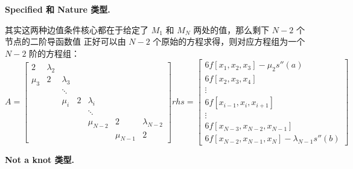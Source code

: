 \documentclass[a4paper]{article}
\begin{document}
\noindent \textbf{Specified 和 Nature 类型.}

其实这两种边值条件核心都在于给定了 $M_1$ 和 $M_{N}$ 两处的值，那么剩下 $N-2$ 个节点的二阶导函数值
正好可以由 $N-2$ 个原始的方程求得，则对应方程组为一个 $N-2$ 阶的方程组：
\begin{equation*}
A = \left[
\begin{matrix}
        2 & \lambda_2 & & & & & \\
        \mu_3 & 2 & \lambda_3 & & & & \\
        & & \ddots & & & & \\
        & & \mu_i & 2 & \lambda_i & & \\
        & & & & \ddots & & \\
        & & & & \mu_{N-2} & 2 & \lambda_{N-2} \\
        & & & & & \mu_{N-1} & 2
\end{matrix}
\right]
rhs = \left[
\begin{matrix}
        6f[x_1, x_2, x_3] - \mu_2 s''(a) \\ 6f[x_2,x_3,x_4] \\ \vdots \\
        6f[x_{i-1},x_i,x_{i+1}] \\ \vdots \\ 6f[x_{N-3},x_{N-2},x_{N-1}] \\
        6f[x_{N-2},x_{N-1},x_N] - \lambda_{N-1} s''(b)
\end{matrix}
\right]
\end{equation*}

\bigskip
\noindent \textbf{Not a knot 类型.}
\end{document}
